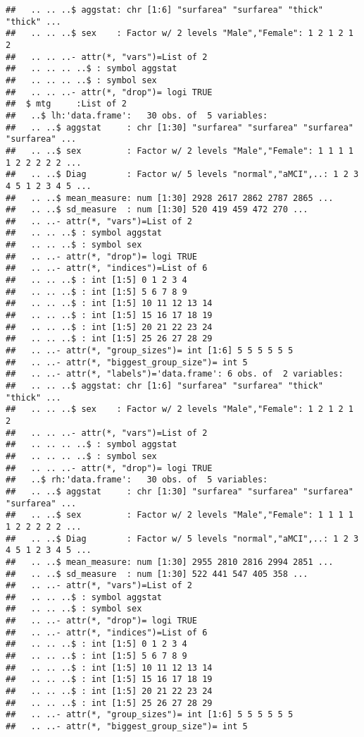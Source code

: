 \documentclass[12pt]{article}\usepackage[]{graphicx}\usepackage[]{color}
\makeatletter
\newenvironment{kframe}{%
 \def\at@end@of@kframe{}%
 \ifinner\ifhmode%
  \def\at@end@of@kframe{\end{minipage}}%
  \begin{minipage}{\columnwidth}%
 \fi\fi%
 \def\FrameCommand##1{\hskip\@totalleftmargin \hskip-\fboxsep
 \colorbox{shadecolor}{##1}\hskip-\fboxsep
     \hskip-\linewidth \hskip-\@totalleftmargin \hskip\columnwidth}%
 \MakeFramed {\advance\hsize-\width
   \@totalleftmargin\z@ \linewidth\hsize
   \@setminipage}}%
 {\par\unskip\endMakeFramed%
 \at@end@of@kframe}
\newenvironment{knitrout}{}{} %
\makeatother
\begin{document}
\begin{knitrout}
\begin{kframe}
\begin{verbatim}
##   .. .. ..$ aggstat: chr [1:6] "surfarea" "surfarea" "thick" "thick" ...
##   .. .. ..$ sex    : Factor w/ 2 levels "Male","Female": 1 2 1 2 1 2
##   .. .. ..- attr(*, "vars")=List of 2
##   .. .. .. ..$ : symbol aggstat
##   .. .. .. ..$ : symbol sex
##   .. .. ..- attr(*, "drop")= logi TRUE
##  $ mtg     :List of 2
##   ..$ lh:'data.frame':	30 obs. of  5 variables:
##   .. ..$ aggstat     : chr [1:30] "surfarea" "surfarea" "surfarea" "surfarea" ...
##   .. ..$ sex         : Factor w/ 2 levels "Male","Female": 1 1 1 1 1 2 2 2 2 2 ...
##   .. ..$ Diag        : Factor w/ 5 levels "normal","aMCI",..: 1 2 3 4 5 1 2 3 4 5 ...
##   .. ..$ mean_measure: num [1:30] 2928 2617 2862 2787 2865 ...
##   .. ..$ sd_measure  : num [1:30] 520 419 459 472 270 ...
##   .. ..- attr(*, "vars")=List of 2
##   .. .. ..$ : symbol aggstat
##   .. .. ..$ : symbol sex
##   .. ..- attr(*, "drop")= logi TRUE
##   .. ..- attr(*, "indices")=List of 6
##   .. .. ..$ : int [1:5] 0 1 2 3 4
##   .. .. ..$ : int [1:5] 5 6 7 8 9
##   .. .. ..$ : int [1:5] 10 11 12 13 14
##   .. .. ..$ : int [1:5] 15 16 17 18 19
##   .. .. ..$ : int [1:5] 20 21 22 23 24
##   .. .. ..$ : int [1:5] 25 26 27 28 29
##   .. ..- attr(*, "group_sizes")= int [1:6] 5 5 5 5 5 5
##   .. ..- attr(*, "biggest_group_size")= int 5
##   .. ..- attr(*, "labels")='data.frame':	6 obs. of  2 variables:
##   .. .. ..$ aggstat: chr [1:6] "surfarea" "surfarea" "thick" "thick" ...
##   .. .. ..$ sex    : Factor w/ 2 levels "Male","Female": 1 2 1 2 1 2
##   .. .. ..- attr(*, "vars")=List of 2
##   .. .. .. ..$ : symbol aggstat
##   .. .. .. ..$ : symbol sex
##   .. .. ..- attr(*, "drop")= logi TRUE
##   ..$ rh:'data.frame':	30 obs. of  5 variables:
##   .. ..$ aggstat     : chr [1:30] "surfarea" "surfarea" "surfarea" "surfarea" ...
##   .. ..$ sex         : Factor w/ 2 levels "Male","Female": 1 1 1 1 1 2 2 2 2 2 ...
##   .. ..$ Diag        : Factor w/ 5 levels "normal","aMCI",..: 1 2 3 4 5 1 2 3 4 5 ...
##   .. ..$ mean_measure: num [1:30] 2955 2810 2816 2994 2851 ...
##   .. ..$ sd_measure  : num [1:30] 522 441 547 405 358 ...
##   .. ..- attr(*, "vars")=List of 2
##   .. .. ..$ : symbol aggstat
##   .. .. ..$ : symbol sex
##   .. ..- attr(*, "drop")= logi TRUE
##   .. ..- attr(*, "indices")=List of 6
##   .. .. ..$ : int [1:5] 0 1 2 3 4
##   .. .. ..$ : int [1:5] 5 6 7 8 9
##   .. .. ..$ : int [1:5] 10 11 12 13 14
##   .. .. ..$ : int [1:5] 15 16 17 18 19
##   .. .. ..$ : int [1:5] 20 21 22 23 24
##   .. .. ..$ : int [1:5] 25 26 27 28 29
##   .. ..- attr(*, "group_sizes")= int [1:6] 5 5 5 5 5 5
##   .. ..- attr(*, "biggest_group_size")= int 5

\end{verbatim}
\end{kframe}
\end{knitrout}
\end{document}
